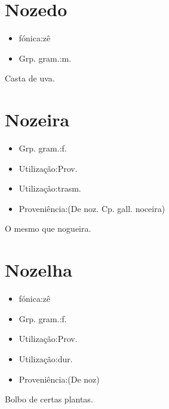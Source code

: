 \section{Nozedo}
\begin{itemize}
\item {fónica:zê}
\end{itemize}
\begin{itemize}
\item {Grp. gram.:m.}
\end{itemize}
Casta de uva.
\section{Nozeira}
\begin{itemize}
\item {Grp. gram.:f.}
\end{itemize}
\begin{itemize}
\item {Utilização:Prov.}
\end{itemize}
\begin{itemize}
\item {Utilização:trasm.}
\end{itemize}
\begin{itemize}
\item {Proveniência:(De \textunderscore noz\textunderscore . Cp. gall. \textunderscore noceira\textunderscore )}
\end{itemize}
O mesmo que \textunderscore nogueira\textunderscore .
\section{Nozelha}
\begin{itemize}
\item {fónica:zê}
\end{itemize}
\begin{itemize}
\item {Grp. gram.:f.}
\end{itemize}
\begin{itemize}
\item {Utilização:Prov.}
\end{itemize}
\begin{itemize}
\item {Utilização:dur.}
\end{itemize}
\begin{itemize}
\item {Proveniência:(De \textunderscore noz\textunderscore )}
\end{itemize}
Bolbo de certas plantas.
